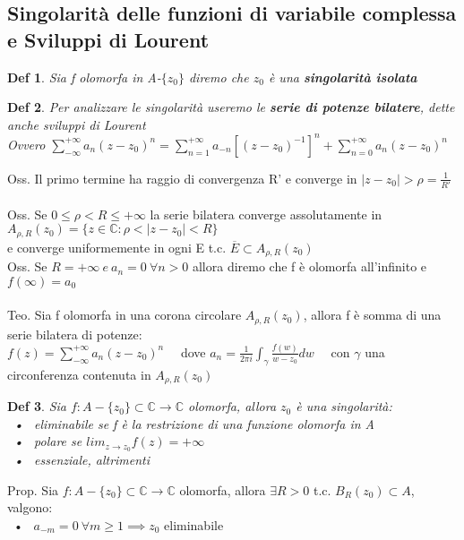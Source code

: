 \documentclass{article}
\theoremstyle{unnumbered}
\newtheorem* {theoremT}{Def}
\theoremstyle{unnumbered1}
\newenvironment{defi}{\begin{gBox}\begin{theoremT}}{\end{theoremT}\end{gBox}}
\begin{document}
\subsection{Singolarità delle funzioni di variabile complessa e Sviluppi di Lourent}
%
\begin{defi} 
Sia f olomorfa in A-$\{z_0\}$ diremo che $z_0$ è una \textbf{singolarità isolata}
\end{defi}
%
\begin{defi} Per analizzare le singolarità useremo le \textbf{serie di potenze bilatere}, dette anche sviluppi di Lourent\\
Ovvero $\sum_{-\infty}^{+\infty}a_n(z-z_0)^n = \sum_{n=1}^{+\infty}a_{-n}[(z-z_0)^{-1}]^n + \sum_{n=0}^{+\infty}a_n(z-z_0)^n$
\end{defi}
Oss. Il primo termine ha raggio di convergenza R' e converge in $|z-z_0|>\rho=\frac{1}{R'}$\\ \\
%
Oss. Se $0\le\rho <R\le+\infty$ la serie bilatera converge assolutamente in $A_{\rho,R}(z_0)=\{z\in\mathbb{C}:\rho<|z-z_0|<R\}$\\
e converge uniformemente in ogni E t.c. $\overline{E}\subset A_{\rho,R}(z_0)$\\ %
%
Oss. Se $R=+\infty \ e \ a_n=0\ \forall n>0$ allora diremo che f è olomorfa all'infinito e $f(\infty)=a_0$\\ \\
%
%
Teo. Sia f olomorfa in una corona circolare $A_{\rho,R}(z_0)$, allora f è somma di una serie bilatera di potenze:\\
$f(z)=\sum_{-\infty}^{+\infty}a_n(z-z_0)^n$ \ \ dove $a_n=\frac{1}{2\pi i}\int_{\gamma}\frac{f(w)}{w-z_0}dw$ \ \ con $\gamma$ una circonferenza contenuta in $A_{\rho,R}(z_0)$\\
%
\begin{defi}Sia $f:A-\{z_0\}\subset\mathbb{C}\rightarrow\mathbb{C}$ olomorfa, allora $z_0$ è una singolarità:\\
\ • \ eliminabile se f è la restrizione di una funzione olomorfa in A\\
\ • \ polare se $lim_{z\rightarrow z_0}f(z)=+\infty$\\
\ • \ essenziale, altrimenti
\end{defi}
%
Prop. Sia $f:A-\{z_0\}\subset\mathbb{C}\rightarrow\mathbb{C}$ olomorfa, allora $\exists R>0$ t.c. $B_R(z_0)\subset A$, valgono:\\
\ • \ $a_{-m}=0 \ \forall m\ge 1 \implies z_0$ eliminabile\\
\end{document}
